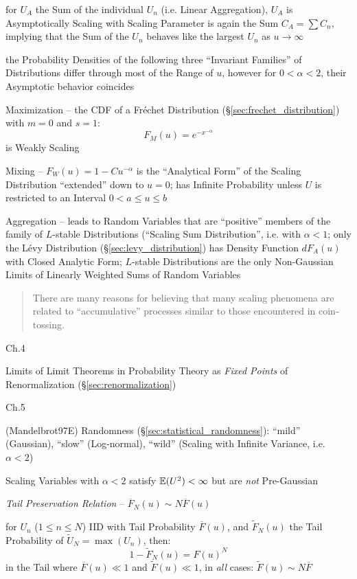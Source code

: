 for $U_A$ the Sum of the individual $U_n$ (i.e. Linear Aggregation), $U_A$ is
Asymptotically Scaling with Scaling Parameter is again the Sum $C_A = \sum C_n$,
implying that the Sum of the $U_n$ behaves like the largest $U_n$ as
$u \to \infty$

the Probability Densities of the following three ``Invariant Families'' of
Distributions differ through most of the Range of $u$, however for $0 < \alpha <
2$, their Asymptotic behavior coincides

Maximization -- the CDF of a Fr\'echet Distribution
(\S\ref{sec:frechet_distribution}) with $m = 0$ and $s = 1$:
\[
  F_M(u) = e^{-x^{-\alpha}}
\]
is Weakly Scaling

Mixing -- $F_W(u) = 1 - Cu^{-\alpha}$ is the ``Analytical Form'' of the Scaling
Distribution ``extended'' down to $u = 0$; has Infinite Probability unless $U$
is restricted to an Interval $0 < a \leq u \leq b$

Aggregation -- leads to Random Variables that are ``positive'' members of the
family of $L$-stable Distributions (``Scaling Sum Distribution'', i.e. with
$\alpha < 1$; only the L\'evy Distribution (\S\ref{sec:levy_distribution}) has
Density Function $dF_A(u)$ with Closed Analytic Form; $L$-stable Distributions
are the only Non-Gaussian Limits of Linearly Weighted Sums of Random Variables

\begin{quote}
  There are many reasons for believing that many scaling phenomena are related
  to ``accumulative'' processes similar to those encountered in coin-tossing.
\end{quote}

Ch.4

Limits of Limit Theorems in Probability Theory as \emph{Fixed
  Points} of Renormalization (\S\ref{sec:renormalization})

Ch.5

(Mandelbrot97E) Randomness (\S\ref{sec:statistical_randomness}): ``mild''
(Gaussian), ``slow'' (Log-normal), ``wild'' (Scaling with Infinite Variance,
i.e. $\alpha < 2$)

Scaling Variables with $\alpha < 2$ satisfy $\mathbb{E}(U^2) < \infty$ but are
\emph{not} Pre-Gaussian

\emph{Tail Preservation Relation} -- $\overline{F}_N(u) \sim N \overline{F}(u)$

for $U_n$ ($1 \leq n \leq N$) IID with Tail Probability $\overline{F}(u)$, and
$\tilde{F}_N(u)$ the Tail Probability of $\tilde{U}_N = \max(U_n)$, then:
\[
  1 - \tilde{F}_N(u) = F(u)^N
\]
in the Tail where $\overline{F}(u) \ll 1$ and $\tilde{F}(u) \ll 1$, in
\emph{all} cases: $\tilde{F}(u) \sim N \overline{F}$

